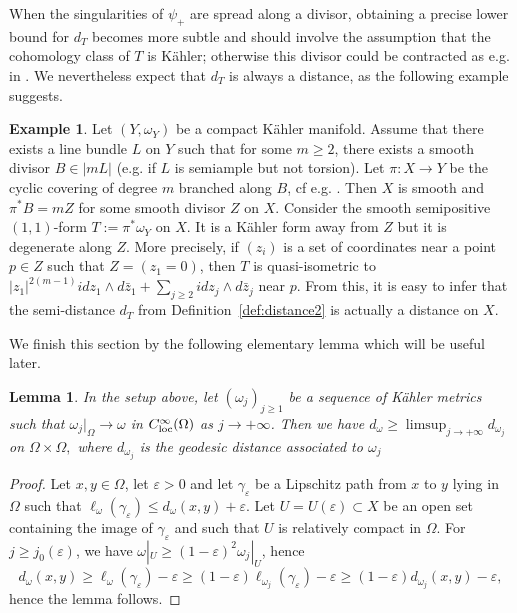 \documentclass[a4paper,11pt,leqno,english]{smfart}
\theoremstyle{plain}
\theoremstyle{plain}
\numberwithin{equation}{section} %
\numberwithin{figure}{section} %
\theoremstyle{plain}
\theoremstyle{plain}
\newtheorem{lem}[thm]{Lemma} %
\theoremstyle{remark}
\theoremstyle{remark}
\theoremstyle{definition}
\newtheorem{exa}[thm]{Example}
\theoremstyle{plain}
\theoremstyle{plain}
\theoremstyle{definition}
\newcommand{\p}{\psi}
\newcommand{\ep}{\varepsilon}
\renewcommand{\ge}{\geq}
\renewcommand{\le}{\leq}
\begin{document}
 When the singularities of $\p_+$ are spread along a divisor, obtaining a precise lower bound for $d_T$ becomes more subtle and should
 involve the assumption that the cohomology class of $T$ is K\"ahler;
 otherwise this divisor could be contracted as e.g. in \cite{SW13}. 
 We nevertheless expect that $d_{T}$ is always a distance, as the following example suggests.

\begin{exa} \label{exa:ramified}
Let $(Y,\omega_Y)$ be a compact Kähler manifold. Assume that there exists a line bundle $L$ on $Y$ such that for some $m\ge 2$, there exists a smooth divisor $B\in |mL|$ (e.g. if $L$ is semiample but not torsion). Let $\pi: X\to Y$ be the cyclic covering of degree $m$ branched along $B$, cf e.g. \cite[Proposition~4.1.6]{PAG1}. Then $X$ is smooth and $\pi^*B=mZ$ for some smooth divisor $Z$ on $X$. Consider the smooth semipositive $(1,1)$-form $T:=\pi^*\omega_Y$ on $X$. It is a Kähler form away from $Z$ but it is degenerate along $Z$. More precisely, if $(z_i)$ is a set of coordinates near a point $p\in Z$ such that $Z=(z_1=0)$, then $T$ is quasi-isometric to 
$|z_1|^{2(m-1)} idz_1\wedge d\bar z_1 + \sum_{j\ge 2} idz_j \wedge d\bar z_j$
near $p$. From this, it is easy to infer that the semi-distance $d_T$ from Definition~\ref{def:distance2} is actually a distance on $X$. 
\end{exa}

We finish this section by the following elementary lemma which will be useful later. 

\begin{lem} \label{ineq dist}
In the setup above, let $(\omega_j)_{j\ge 1}$ be a sequence of Kähler metrics such that $\omega_j|_{\Omega} \to \omega$ in $C^{\infty}_{\rm loc}(\Omega)$ as $j\to +\infty$. Then we have
$d_\omega \ge \limsup_{j\to +\infty} d_{\omega_j}$ on  $\Omega\times \Omega,$
where $d_{\omega_j}$ is the geodesic distance associated to $\omega_j$
\end{lem}

\begin{proof}
Let $x,y\in \Omega$, let $\ep>0$ and let $\gamma_\ep$ be a Lipschitz path  from $x$ to $y$ lying in $\Omega$ such that $\ell_\omega(\gamma_\ep)\le d_\omega(x,y)+\ep$. Let $U=U(\ep)\subset X$ be an open set containing the image of $\gamma_\ep$ and such that $U$ is relatively compact in $\Omega$. For $j\ge j_0(\ep)$, we have $\omega|_U \ge (1-\ep)^2 {\omega_j}|_U$, hence
\[d_{\omega}(x,y)\ge \ell_\omega(\gamma_\ep)-\ep \ge (1-\ep)\ell_{\omega_j}(\gamma_\ep)-\ep \ge  (1-\ep)d_{\omega_j}(x,y)-\ep,\]
hence the lemma follows.
\end{proof}
\end{document}
